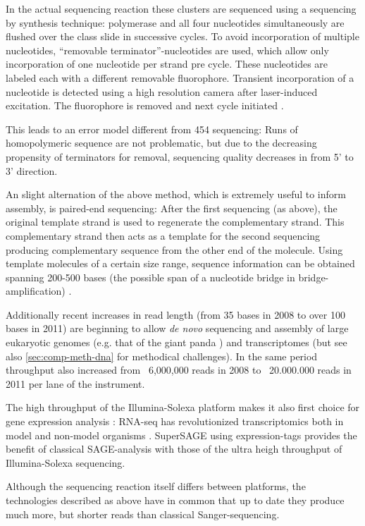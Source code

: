 In the actual sequencing reaction these clusters are sequenced using a
sequencing by synthesis technique: polymerase and all four nucleotides
simultaneously are flushed over the class slide in successive
cycles. To avoid incorporation of multiple nucleotides, ``removable
terminator''-nucleotides are used, which allow only incorporation of
one nucleotide per strand pre cycle. These nucleotides are labeled
each with a different removable fluorophore. Transient incorporation
of a nucleotide is detected using a high resolution camera after
laser-induced excitation. The fluorophore is removed and next cycle
initiated \cite{pmid18987734}.

This leads to an error model different from 454 sequencing: Runs of
homopolymeric sequence are not problematic, but due to the decreasing
propensity of terminators for removal, sequencing quality decreases in
from 5' to 3' direction.

An slight alternation of the above method, which is extremely useful
to inform assembly, is paired-end sequencing: After the first
sequencing (as above), the original template strand is used to
regenerate the complementary strand. This complementary strand then
acts as a template for the second sequencing producing complementary
sequence from the other end of the molecule. Using template molecules
of a certain size range, sequence information can be obtained spanning
200-500 bases (the possible span of a nucleotide bridge in
bridge-amplification) \cite{pmid18987734}.

Additionally recent increases in read length (from 35 bases in 2008 to
over 100 bases in 2011) are beginning to allow \textit{de novo}
sequencing and assembly of large eukaryotic genomes (e.g. that of the
giant panda \cite{pmid20010809}) and transcriptomes
\cite{pmid21679424} (but see also \ref{sec:comp-meth-dna} for
methodical challenges). In the same period throughput also increased
from ~6,000,000 reads in 2008 to ~20.000.000 reads in 2011 per lane of
the instrument.

The high throughput of the Illumina-Solexa platform makes it also
first choice for gene expression analysis \cite{pmid21627854}: RNA-seq
has revolutionized transcriptomics both in model and non-model
organisms \cite{pmid19015660}. SuperSAGE \cite{pmid20967605} using
expression-tags provides the benefit of classical SAGE-analysis
\cite{pmid7570003} with those of the ultra heigh throughput of
Illumina-Solexa sequencing.

Although the sequencing reaction itself differs between platforms, the
technologies described as above have in common that up to date they
produce much more, but shorter reads than classical Sanger-sequencing.

